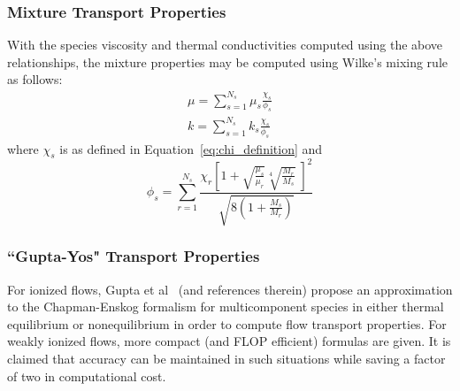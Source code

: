 \subsubsection{Mixture Transport Properties}
With the species viscosity and thermal conductivities computed using the above relationships, the mixture properties may be computed using Wilke's mixing rule as follows:
\begin{align}
  \label{eq:mixture_viscosity}
  \mu = \sum_{s=1}^{N_s} \mu_s\frac{\chi_s}{\phi_s} \\
  \label{eq:mixture_conductivity}
  k   = \sum_{s=1}^{N_s}   k_s\frac{\chi_s}{\phi_s} 
\end{align}
where $\chi_s$ is as defined in Equation~\eqref{eq:chi_definition} and
\begin{equation}
  \phi_s = \sum_{r=1}^{N_s} \frac{\chi_r \left[1+\sqrt{\frac{\mu_s}{\mu_r}} \sqrt[4]{\frac{M_r}{M_s}}\;\right]^2}{\sqrt{8\left(1+\frac{M_s}{M_r}\right)}}
\end{equation}



\subsubsection{``Gupta-Yos" Transport Properties}

For ionized flows, Gupta et al~\cite{GuptaYosetal1990} (and references therein) propose an approximation to the 
Chapman-Enskog formalism for multicomponent species in either thermal equilibrium or nonequilibrium in order 
to compute flow transport properties. For weakly ionized flows, more compact (and FLOP efficient) formulas are given. It
is claimed that accuracy can be maintained in such situations while saving a factor of two in computational cost. 

